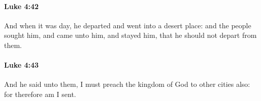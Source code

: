 		\paragraph{Luke 4:42} %
			\label{LUKE-4-42}

			And when it was day, he departed and went into a desert place: and the people sought him, and came unto him, and stayed him, that he should not depart from them.

			\begin{framed}
			\scriptsize
				\begin{compactdesc}
					\item[SBLG] 
				\end{compactdesc}
			\end{framed}

		\paragraph{Luke 4:43} %
			\label{LUKE-4-43}

			And he said unto them, I must preach the kingdom of God to other cities also: for therefore am I sent.

